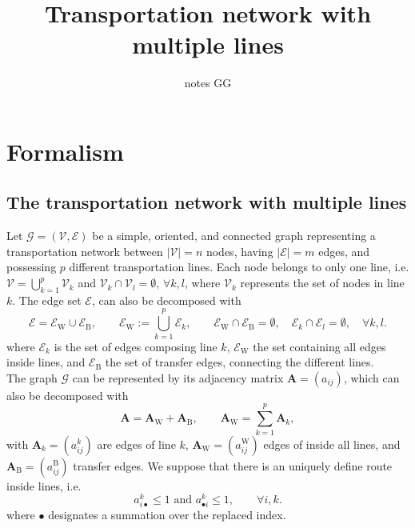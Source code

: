 \documentclass[11p]{article}
\title{Transportation network with multiple lines}
\author{notes GG}
\begin{document}
\maketitle

\section{Formalism}

\subsection{The transportation network with multiple lines}

Let $\mathcal{G} = (\mathcal{V}, \mathcal{E})$ be a simple, oriented, and connected graph representing a transportation network between $|\mathcal{V}| = n$ nodes, having $|\mathcal{E}| = m$ edges, and possessing $p$ different transportation lines. Each node belongs to only one line, i.e. $\mathcal{V} = \bigcup_{k=1}^p \mathcal{V}_k$ and $\mathcal{V}_k \cap \mathcal{V}_l = \emptyset, \, \forall k,l$, where $\mathcal{V}_k$ represents the set of nodes in line $k$. The edge set $\mathcal{E}$, can also be decomposed with
\begin{equation}
\mathcal{E} = \mathcal{E}_\text{W} \cup \mathcal{E}_\text{B}, \qquad \mathcal{E}_\text{W} := \bigcup_{k=1}^p \mathcal{E}_k, \qquad \mathcal{E}_\text{W} \cap \mathcal{E}_\text{B} = \emptyset, \quad \mathcal{E}_k \cap \mathcal{E}_l = \emptyset, \quad \forall k, l.
\end{equation}
where $\mathcal{E}_k$ is the set of edges composing line $k$, $\mathcal{E}_\text{W}$ the set containing all edges inside lines, and $\mathcal{E}_\text{B}$ the set of transfer edges, connecting the different lines. \\
The graph $\mathcal{G}$ can be represented by its adjacency matrix $\mathbf{A} = (a_{ij})$, which can also be decomposed with 
\begin{equation}
\mathbf{A} = \mathbf{A}_\text{W} + \mathbf{A}_\text{B}, \qquad \mathbf{A}_\text{W} = \sum_{k=1}^p \mathbf{A}_k,
\end{equation}
with $\mathbf{A}_k = (a^k_{ij})$ are edges of line $k$, $\mathbf{A}_\text{W} = (a^\text{W}_{ij})$ edges of inside all lines, and $\mathbf{A}_\text{B} = (a^\text{B}_{ij})$ transfer edges. We suppose that there is an uniquely define route inside lines, i.e. 
\begin{equation}
a^k_{i \bullet} \leq 1 \text{ and } a^k_{\bullet i} \leq 1, \qquad \forall i,k.
\end{equation}
where $\bullet$ designates a summation over the replaced index.
\end{document}
